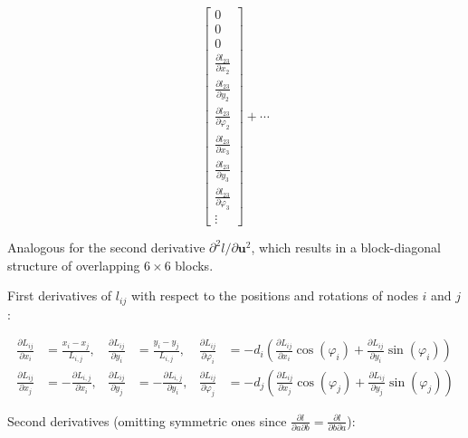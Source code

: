 \begin{equation}
\begin{bmatrix}
0 \\
0 \\
0 \\
\frac{\partial l_{23}}{\partial x_{2}} \\
\frac{\partial l_{23}}{\partial y_{2}} \\
\frac{\partial l_{23}}{\partial \varphi_{2}} \\
\frac{\partial l_{23}}{\partial x_{3}} \\
\frac{\partial l_{23}}{\partial y_{3}} \\
\frac{\partial l_{23}}{\partial \varphi_{3}} \\
\vdots
\end{bmatrix}
+
\cdots
\end{equation}

Analogous for the second derivative $\partial^2 l/\partial \boldsymbol{u}^2$, which results in a block-diagonal structure of overlapping $6 \times 6$ blocks.

First derivatives of $l_{ij}$ with respect to the positions and rotations of nodes $i$ and $j$:


\begin{align}
\frac{\partial L_{ij}}{\partial x_i} &= \frac{x_i - x_j}{L_{i,j}} , & \frac{\partial L_{ij}}{\partial y_i} &= \frac{y_i - y_j}{L_{i,j}}, & \frac{\partial L_{ij}}{\partial \varphi_i} &= -d_{i}\left(\frac{\partial L_{ij}}{\partial x_i}\cos(\varphi_i) + \frac{\partial L_{ij}}{\partial y_i}\sin(\varphi_i)\right) \\
\frac{\partial L_{ij}}{\partial x_j} &= -\frac{\partial L_{i,j}}{\partial x_i}, & \frac{\partial L_{ij}}{\partial y_j} &= -\frac{\partial L_{i,j}}{\partial y_i}, & \frac{\partial L_{ij}}{\partial \varphi_j} &= -d_{j}\left(\frac{\partial L_{ij}}{\partial x_j}\cos(\varphi_j) + \frac{\partial L_{ij}}{\partial y_j}\sin(\varphi_j)\right)
\end{align}

Second derivatives (omitting symmetric ones since $\frac{\partial l}{\partial a \partial b} = \frac{\partial l}{\partial b \partial a}$):

